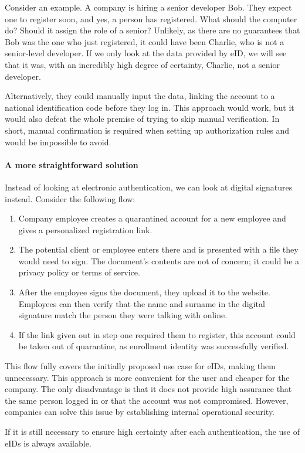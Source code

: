 Consider an example. A company is hiring a senior developer Bob. They expect one to register soon, and yes, a person has registered. What should the computer do? Should it assign the role of a senior? Unlikely, as there are no guarantees that Bob was the one who just registered, it could have been Charlie, who is not a senior-level developer. If we only look at the data provided by eID, we will see that it was, with an incredibly high degree of certainty, Charlie, not a senior developer.

Alternatively, they could manually input the data, linking the account to a national identification code before they log in. This approach would work, but it would also defeat the whole premise of trying to skip manual verification. In short, manual confirmation is required when setting up authorization rules and would be impossible to avoid.

\paragraph{A more straightforward solution}

Instead of looking at electronic authentication, we can look at digital signatures instead. Consider the following flow:

\begin{enumerate}
    \item Company employee creates a quarantined account for a new employee and gives a personalized registration link.
    \item The potential client or employee enters there and is presented with a file they would need to sign. The document's contents are not of concern; it could be a privacy policy or terms of service.
    \item After the employee signs the document, they upload it to the website. Employees can then verify that the name and surname in the digital signature match the person they were talking with online.
    \item If the link given out in step one required them to register, this account could be taken out of quarantine, as enrollment identity was successfully verified.
\end{enumerate}

This flow fully covers the initially proposed use case for eIDs, making them unnecessary. This approach is more convenient for the user and cheaper for the company. The only disadvantage is that it does not provide high assurance that the same person logged in or that the account was not compromised. However, companies can solve this issue by establishing internal operational security.

If it is still necessary to ensure high certainty after each authentication, the use of eIDs is always available.